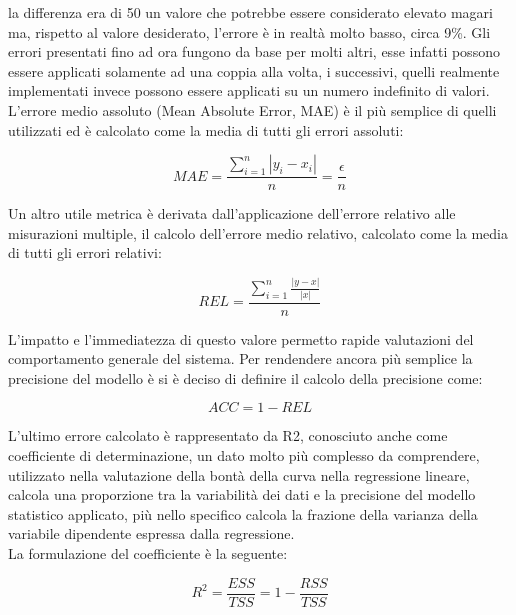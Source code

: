 \documentclass[%
    corpo=12pt,
    twoside,
    oldstyle,
    autoretitolo,
    greek,
    evenboxes,
]{toptesi}
\begin{document}
la differenza era di 50 un valore che potrebbe essere considerato elevato magari ma, rispetto al valore desiderato, l'errore è in realtà molto basso, circa 9\%. Gli errori presentati fino ad ora fungono da base per molti altri, esse infatti possono essere applicati solamente ad una coppia alla volta, i successivi, quelli realmente implementati invece possono essere applicati su un numero indefinito di valori.\\
L'errore medio assoluto (Mean Absolute Error, MAE) è il più semplice di quelli utilizzati ed è calcolato come la media di tutti gli errori assoluti:
\begin{center}
  \begin{equation}
    MAE = \frac{\sum_{i=1}^{n}{|y_{i} - x_{i}|}}{n} = \frac{\epsilon}{n}
  \end{equation}
\end{center}
Un altro utile metrica è derivata dall'applicazione dell'errore relativo alle misurazioni multiple, il calcolo dell'errore medio relativo, calcolato come la media di tutti gli errori relativi:
\begin{center}
  \begin{equation}
    REL = \frac{\sum_{i=1}^{n}{\frac{|y - x|}{|x|}}}{n}
  \end{equation}
\end{center}
L'impatto e l'immediatezza di questo valore permetto rapide valutazioni del comportamento generale del sistema. Per rendendere ancora più semplice la precisione del modello è si è deciso di definire il calcolo della precisione come:
\begin{center}
  \begin{equation}
    ACC = 1 - REL
  \end{equation}
\end{center}
L'ultimo errore calcolato è rappresentato da R2, conosciuto anche come coefficiente di determinazione, un dato molto più complesso da comprendere, utilizzato nella valutazione della bontà della curva nella regressione lineare, calcola una proporzione tra la variabilità dei dati e la precisione del modello statistico applicato, più nello specifico calcola la frazione della varianza della variabile dipendente espressa dalla regressione.\\
La formulazione del coefficiente è la seguente:
\begin{center}
  \begin{equation}
    R^2 = \frac{ESS}{TSS} = 1 - \frac{RSS}{TSS}
  \end{equation}
\end{center}
\end{document}
